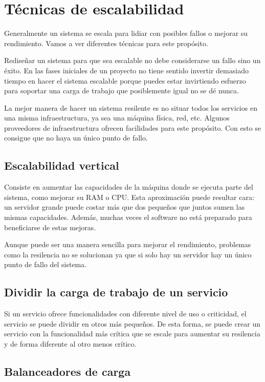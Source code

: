 \documentclass[11pt,a4paper]{article}
\begin{document}
\section{Técnicas de escalabilidad}
Generalmente un sistema se escala para lidiar con posibles fallos o mejorar su rendimiento. Vamos a ver diferentes técnicas para este propósito.

Rediseñar un sistema para que sea escalable no debe considerarse un fallo sino un éxito. En las fases iniciales de un proyecto no tiene sentido invertir demasiado tiempo en hacer el sistema escalable porque puedes estar invirtiendo esfuerzo para soportar una carga de trabajo que posiblemente igual no se dé nunca.

La mejor manera de hacer un sistema resilente es no situar todos los servicios en una misma infraestructura, ya sea una máquina física, red, etc. Algunos proveedores de infraestructura ofrecen facilidades para este propósito. Con esto se consigue que no haya un único punto de fallo.

\subsection{Escalabilidad vertical}

Consiste en aumentar las capacidades de la máquina donde se ejecuta parte del sistema, como mejorar su RAM o CPU. Esta aproximación puede resultar cara: un servidor grande puede costar más que dos pequeños que juntos sumen las mismas capacidades. Además, muchas veces el software no está preparado para beneficiarse de estas mejoras. 

Aunque puede ser una manera sencilla para mejorar el rendimiento, problemas como la resilencia no se solucionan ya que si solo hay un servidor hay un único punto de fallo del sistema.

\subsection{Dividir la carga de trabajo de un servicio}

Si un servicio ofrece funcionalidades con diferente nivel de uso o criticidad, el servicio se puede dividir en otros más pequeños. De esta forma, se puede crear un servicio con la funcionalidad más crítica que se escale para aumentar su resilencia y de forma diferente al otro menos crítico.

\subsection{Balanceadores de carga}
\end{document}
